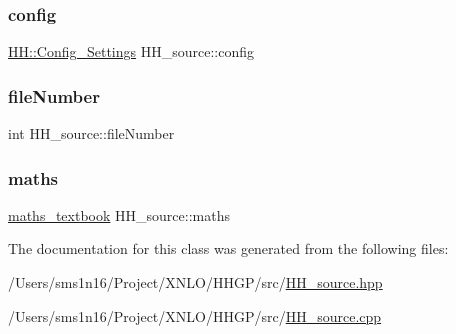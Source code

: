 \subsubsection{\texorpdfstring{config}{config}}
{\footnotesize\ttfamily \hyperlink{class_h_h_1_1_config___settings}{H\+H\+::\+Config\+\_\+\+Settings} H\+H\+\_\+source\+::config\hspace{0.3cm}{\ttfamily [private]}}

\mbox{\label{class_h_h__source_a6631481cc1bea05ab564cb1841644a12}} 
\subsubsection{\texorpdfstring{file\+Number}{fileNumber}}
{\footnotesize\ttfamily int H\+H\+\_\+source\+::file\+Number\hspace{0.3cm}{\ttfamily [private]}}

\mbox{\label{class_h_h__source_a93637ad30af846dd04eb741437114f8f}} 
\subsubsection{\texorpdfstring{maths}{maths}}
{\footnotesize\ttfamily \hyperlink{classmaths__textbook}{maths\+\_\+textbook} H\+H\+\_\+source\+::maths\hspace{0.3cm}{\ttfamily [private]}}



The documentation for this class was generated from the following files\+:\begin{DoxyCompactItemize}
\item 
/\+Users/sms1n16/\+Project/\+X\+N\+L\+O/\+H\+H\+G\+P/src/\hyperlink{_h_h__source_8hpp}{H\+H\+\_\+source.\+hpp}\item 
/\+Users/sms1n16/\+Project/\+X\+N\+L\+O/\+H\+H\+G\+P/src/\hyperlink{_h_h__source_8cpp}{H\+H\+\_\+source.\+cpp}\end{DoxyCompactItemize}
